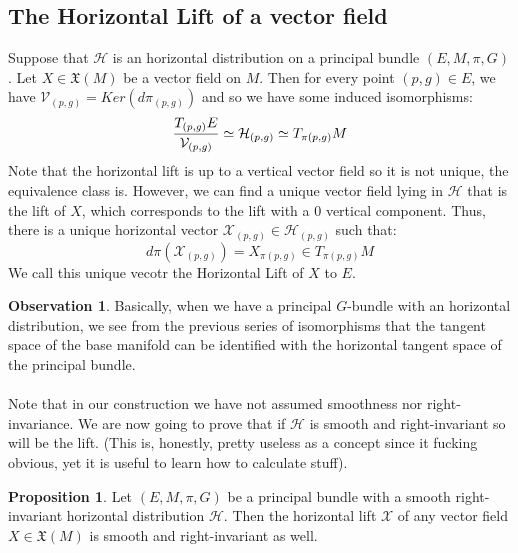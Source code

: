 \documentclass[12pt,a4paper]{report}
\theoremstyle{definition}
\theoremstyle{Theorem}
\newtheorem{Prop}[Def]{Proposition}
\theoremstyle{definition}
\theoremstyle{definition}
\newtheorem{Obs}[Def]{Observation}
\begin{document}
		\subsection{The Horizontal Lift of a vector field}
		Suppose that $\mathcal{H}$ is an horizontal distribution on a principal bundle $(E,M,\pi,G)$. Let $X\in\mathfrak{X}(M)$ be a vector field on $M$. Then for every point $(p,g)\in E$, we have $\mathcal{V}_{(p,g)}=Ker(d\pi_{(p,g)})$ and so we have some induced isomorphisms:
		$${T_{(p,g)}E\over \mathcal{V}_{(p,g)}}\simeq \mathcal{H}_{(p,g)}\simeq T_{\pi(p,g)}M$$
		Note that the horizontal lift is up to a vertical vector field so it is not unique, the equivalence class is. However, we can find a unique vector field lying in $\mathcal{H}$ that is the lift of $X$, which corresponds to the lift with a 0 vertical component.
		Thus, there is a unique horizontal vector $\mathcal{X}_{(p,g)}\in\mathcal{H}_{(p,g)}$ such that:
		$$d\pi(\mathcal{X}_{(p,g)})=X_{\pi(p,g)}\in T_{\pi(p,g)}M$$
		We call this unique vecotr the Horizontal Lift of $X$ to $E$.
		\begin{Obs}
			Basically, when we have a principal $G$-bundle with an horizontal distribution, we see from the previous series of isomorphisms that the tangent space of the base manifold can  be identified with the horizontal tangent space of the principal bundle.\\
			\\
			Note that in our construction we have not assumed smoothness nor right-invariance. We are now going to prove that if $\mathcal{H}$ is smooth and right-invariant so will be the lift. (This is, honestly, pretty useless as a concept since it fucking obvious, yet it is useful to learn how to calculate stuff).
		\end{Obs}
		\begin{Prop}
			Let $(E,M,\pi,G)$ be a principal bundle with a smooth right-invariant horizontal distribution $\mathcal{H}$. Then the horizontal lift $\mathcal{X}$ of any vector field $X\in\mathfrak{X}(M)$ is smooth and right-invariant as well.
		\end{Prop}
\end{document}
